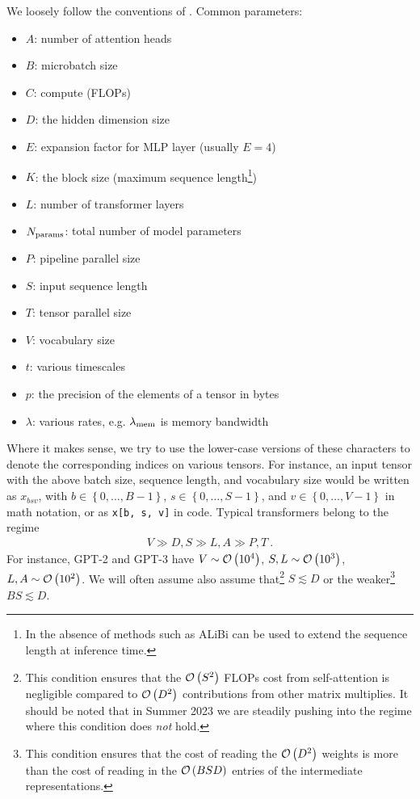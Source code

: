 \documentclass[11pt]{article}
\begin{document}
We loosely follow the conventions of \cite{korthikanti2022reducing}.  Common parameters:
\begin{itemize}
	\item $ A $: number of attention heads
	\item $ B $: microbatch size
	\item $ C $: compute (FLOPs)
	\item $ D $: the hidden dimension size
	\item $ E $: expansion factor for MLP layer (usually $ E=4 $)
	\item $ K $: the block size (maximum sequence length\footnote{In the absence of methods such as         ALiBi \cite{ALiBi}  can be used to extend the sequence length at inference time.})
	\item $ L $: number of transformer layers
	\item $ N _{ {\rm params}  } $: total number of model parameters
	\item $ P $: pipeline parallel size
	\item $ S $: input sequence length
	\item $ T $: tensor parallel size
	\item $ V $: vocabulary size
	\item $ t $: various timescales
	\item $ p $: the precision of the elements of a tensor in bytes
	\item $ \lambda  $: various rates, e.g. $ \lambda _{ {\rm mem}  } $ is memory bandwidth
\end{itemize}
Where it makes sense, we try to use the lower-case versions of these characters to denote the
corresponding indices on various tensors. For instance, an input tensor with the above batch size,
sequence length, and vocabulary size would be written as $ x _{ bsv } $, with $ b \in \left \{ 0,
	\ldots, B - 1 \right \} $, $ s \in \left \{ 0, \ldots, S - 1\right \} $, and $  v \in \left \{ 0,
	\ldots, V -1\right \}$ in math notation, or as \texttt{x[b, s, v]} in code.  Typical
transformers belong to the regime
\begin{gather}
	V \gg D, S \gg L, A \gg P, T \ .  \label{app_eq_transformers_approxs}
\end{gather}
For instance, GPT-2 and GPT-3 \cite{gpt2radford2019language, gpt3brown2020language} have $ V \sim
	\mathcal{O} \left( 10 ^{ 4 } \right)  $, $ S, L \sim \mathcal{O} \left( 10 ^{ 3 } \right)  $, $ L, A \sim \mathcal{O}
	\left( 10 ^{ 2 } \right)  $. We will often assume also assume that\footnote{This condition ensures
	that the $ \mathcal{O} \left( S ^{ 2 } \right)  $ FLOPs cost from self-attention is negligible
	compared to $ \mathcal{O} \left( D ^{ 2 } \right)  $ contributions from other matrix multiplies.  It
	should be noted that in Summer 2023 we are steadily pushing into the regime where this condition
	does \textit{not}  hold.} $ S \lesssim D $ or the weaker\footnote{This condition ensures that the
	cost of reading the $ \mathcal{O} \left( D ^{ 2 } \right)  $ weights is more than the cost of reading in
	the $ \mathcal{O} \left( BSD \right)  $ entries of the intermediate representations.} $ BS \lesssim D $.
\end{document}
